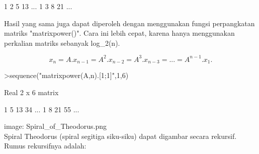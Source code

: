 \documentclass[a4paper,10pt]{article}
\begin{document}
\begin{eulernotebook}
\begin{eulercomment}
\begin{eulercomment}
\begin{euleroutput}
              1             2             5            13     ...
              1             3             8            21     ...
\end{euleroutput}
\begin{eulercomment}
Hasil yang sama juga dapat diperoleh dengan menggunakan fungsi perpangkatan matriks
"matrixpower()". Cara ini lebih cepat, karena hanya menggunakan perkalian matriks sebanyak
log\_2(n).

\end{eulercomment}
\begin{eulerformula}
\[
x_n=A.x_{n-1}=A^2.x_{n-2}=A^3.x_{n-3}= ... = A^{n-1}.x_1.
\]
\end{eulerformula}
\begin{eulerprompt}
>sequence("matrixpower(A,n).[1;1]",1,6)
\end{eulerprompt}
\begin{euleroutput}
  Real 2 x 6 matrix
  
              1             5            13            34     ...
              1             8            21            55     ...
\end{euleroutput}
\begin{eulercomment}
image: Spiral\_of\_Theodorus.png\\
Spiral Theodorus (spiral segitiga siku-siku) dapat digambar secara rekursif. Rumus
rekursifnya adalah:


\end{eulercomment}
\end{eulercomment}
\end{eulercomment}
\end{eulernotebook}
\end{document}
